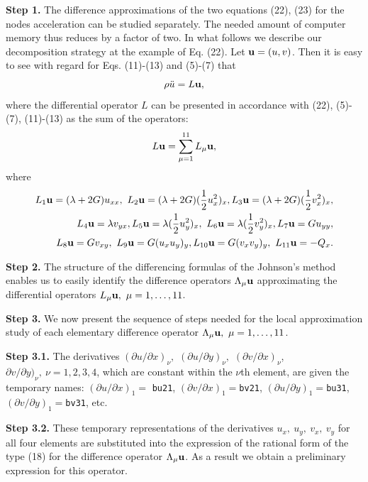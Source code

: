   {\bf Step 1.} The difference approximations of the two equations (22), (23)
for the nodes acceleration can be studied separately. The needed amount of
computer memory thus reduces by a factor of two. In what follows we describe
our decomposition strategy at the example of Eq. (22). Let ${\bf u}=(u,v)$.
Then it is easy to see with regard for Eqs. (11)-(13) and (5)-(7) that
$$\rho \ddot{u}=L{\bf u},$$
where the differential operator $L$ can be presented in accordance with (22),
(5)-(7), (11)-(13) as the sum of the operators:
\begin{equation}
L{\bf u}=\sum_{\mu=1}^{11}L_{\mu}{\bf u},
\end{equation}
where
\begin{eqnarray}
L_1{\bf u}=(\lambda + 2G)u_{xx},~L_2{\bf u}=(\lambda + 2G)(\frac{1}{2}u_x^2)_x,
L_3{\bf u}=(\lambda + 2G)(\frac{1}{2}v_x^2)_x,
\nonumber\\
L_4{\bf u}=\lambda v_{yx},
L_5{\bf u}=\lambda(\frac{1}{2}u_y^2)_x,~L_6{\bf u}=\lambda(\frac{1}{2}v_y^2)_x,
L_7{\bf u}=Gu_{yy},\\
L_8{\bf u}=Gv_{xy},~L_9{\bf u}=G(u_xu_y)_y,
L_{10}{\bf u}=G(v_xv_y)_y,~L_{11}{\bf u}=-Q_x.\nonumber
\end{eqnarray}

 {\bf Step 2.} The structure of the differencing formulas of the Johnson's
method enables us to easily identify the difference operators $\Lambda_{\mu}
{\bf u}$ approximating the differential operators $L_{\mu}{\bf u},~\mu=1,
\ldots,11$.

 {\bf Step 3.} We now present the sequence of steps needed for the local
approximation study of each elementary difference operator $\Lambda_{\mu}
{\bf u},~\mu=1,\ldots,11$.

 {\bf Step 3.1.} The derivatives $(\partial u/\partial x)_\nu,$
$(\partial u/\partial y)_\nu,$ $(\partial v/\partial x)_\nu$,
$\partial v/\partial y)_\nu,~\nu=1,2,3,4$, which are constant within the
$\nu$th element, are given the temporary names: $(\partial u/\partial x)_1=$
{\tt bu21}, $(\partial v/\partial x)_1=${\tt bv21}, $(\partial u/\partial y)_1
=${\tt bu31}, $(\partial v/\partial y)_1=${\tt bv31}, etc.

 {\bf Step 3.2.} These temporary representations of the derivatives $u_x,~u_y,
~v_x,~v_y$ for all four elements are substituted into the expression of the
rational form of the type (18) for the difference operator
$\Lambda_\mu{\bf u}$. As a result we obtain a preliminary expression for this
operator.


